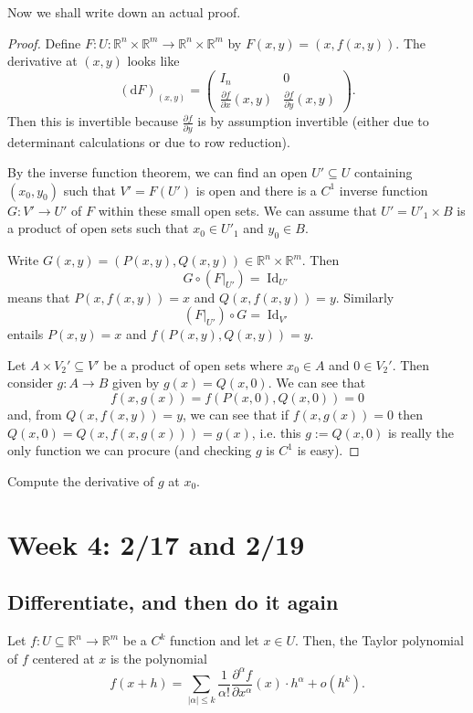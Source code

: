 \documentclass[10pt]{scrartcl}
\providecommand{\RR}{\mathbb R}
\providecommand{\opname}{\operatorname}
\begin{document}
Now we shall write down an actual proof.

\begin{proof}
	Define $F\colon U\colon \RR^n\times\RR^m\to\RR^n\times\RR^m$ by
	$F(x,y) = (x,f(x,y))$. The derivative at $(x,y)$ looks like
	\[(\mathrm dF)_{(x,y)} = \begin{pmatrix}
		I_n & 0\\
		\frac{\partial f}{\partial x}(x,y) & \frac{\partial f}{\partial y}(x,y)
	\end{pmatrix}.\]
	Then this is invertible because $\frac{\partial f}{\partial y}$
	is by assumption invertible (either due to determinant calculations
	or due to row reduction).
	
	By the inverse function theorem, we can find an open $U'\subseteq U$
	containing $(x_0,y_0)$ such that $V' = F(U')$ is open
	and there is a $C^1$ inverse function $G\colon V'\to U'$
	of $F$ within these small open sets. We can assume that
	$U' = U'_1\times B$ is a product of open sets such that $x_0\in U'_1$
	and $y_0\in B$.
	
	Write $G(x,y) = (P(x,y), Q(x,y))\in\RR^n\times\RR^m$. Then
	\[G\circ (F|_{U'}) = \opname{Id}_{U'}\]
	means that $P(x, f(x,y)) = x$ and $Q(x,f(x,y)) = y$.
	Similarly
	\[(F|_{U'})\circ G = \opname{Id}_{V'}\]
	entails $P(x,y) = x$ and $f(P(x,y), Q(x,y)) = y$.
	
	Let $A\times V_2'\subseteq V'$ be a product of open sets
	where $x_0\in A$ and $0\in V_2'$.
	Then consider $g\colon A\to B$ given by $g(x) = Q(x,0)$.
	We can see that
	\[f(x, g(x)) = f(P(x, 0), Q(x, 0)) = 0\]
	and, from $Q(x, f(x,y)) = y$, we can see that if $f(x, g(x)) = 0$ then
	$Q(x, 0) = Q(x, f(x, g(x))) = g(x)$, i.e. this $g := Q(x, 0)$
	is really the only function we can procure
	(and checking $g$ is $C^1$ is easy).
\end{proof}

\begin{exercise}
	Compute the derivative of $g$ at $x_0$.
\end{exercise}

\section{Week 4: 2/17 and 2/19}
\subsection{Differentiate, and then do it again}

\begin{theorem}
	Let $f\colon U\subseteq\RR^n\to\RR^m$ be a $C^k$ function and let $x\in U$.
	Then, the Taylor polynomial of $f$ centered at $x$ is the polynomial
	\[f(x + h) = \sum_{|\alpha|\le k} \frac{1}{\alpha!}
	\frac{\partial^{\alpha}f}{\partial x^{\alpha}}(x)\cdot h^\alpha + o(h^k).\]
\end{theorem}
\end{document}
